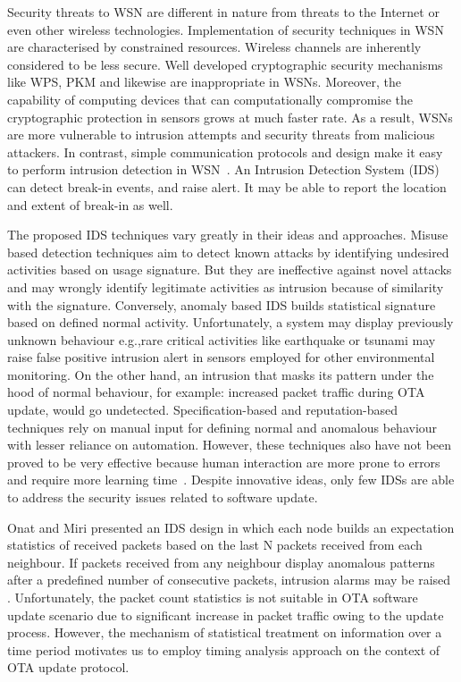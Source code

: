 \documentclass[conference]{IEEEtran}
\begin{document}
Security threats to WSN are different in nature from threats to the Internet or even other wireless technologies. %
Implementation of security techniques in WSN are characterised by constrained resources.
Wireless channels are inherently considered to be less secure.
Well developed cryptographic security mechanisms like WPS, PKM and likewise are inappropriate in WSNs.
Moreover, the capability of computing devices that can computationally compromise the cryptographic protection in sensors grows at much faster rate.
As a result, WSNs are more vulnerable to intrusion attempts and security threats from malicious attackers.
In contrast, simple communication protocols and design make it easy to perform intrusion detection in WSN~\cite{quing09}.
An Intrusion Detection System (IDS) can detect  break-in events, and raise alert. %
It may be able to report the location and extent of break-in as well.


The proposed IDS techniques vary greatly in their ideas and approaches.
Misuse based  detection  techniques aim to detect known attacks by identifying undesired activities based on usage signature.
But they are ineffective against novel attacks and 
may wrongly identify legitimate activities as intrusion because of similarity with the signature.
Conversely, anomaly based IDS builds statistical signature based on defined normal activity.
Unfortunately, a system may display previously unknown behaviour e.g.,rare critical activities like earthquake or tsunami may raise false positive intrusion alert in sensors employed for other environmental monitoring.
On the other hand, an intrusion that masks its pattern under the hood of normal behaviour, for example: increased packet traffic during OTA update, would go undetected.
Specification-based and reputation-based techniques rely on manual input for defining normal and anomalous behaviour with lesser reliance on automation.
However, these techniques also have not been proved to be very effective because human interaction are more prone to errors and require more learning time~\cite{quing09, 1593102, 1290173, Chen:2009:NMI:1516241.1516282}. 
Despite innovative ideas, only few IDSs are able to address the security issues related to software update.

Onat and Miri presented an IDS design in which each node builds an expectation statistics of received packets based on the last N packets received from each neighbour.
If packets received from any neighbour display anomalous patterns after a predefined number of consecutive packets, intrusion alarms may be raised \cite{1512911}.
Unfortunately, the  packet count statistics is not suitable in OTA software update scenario due to significant increase in packet traffic owing to the update process. 
However, the mechanism of statistical treatment on information over a time period motivates us to employ timing analysis approach on the context of OTA update protocol.
\end{document}
